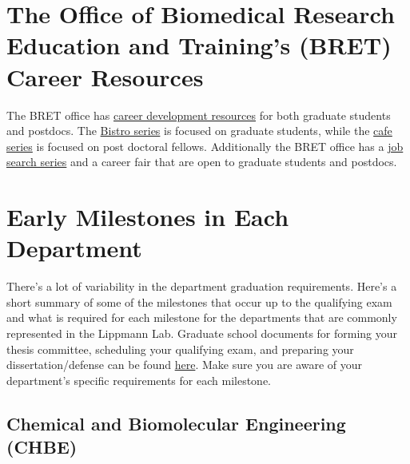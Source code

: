 \documentclass[
]{book}
\begin{document}
\hypertarget{the-office-of-biomedical-research-education-and-trainings-bret-career-resources}{%
\section{The Office of Biomedical Research Education and Training's (BRET) Career Resources}\label{the-office-of-biomedical-research-education-and-trainings-bret-career-resources}}

The BRET office has \href{https://medschool.vanderbilt.edu/career-development/}{career development resources} for both graduate students and postdocs. The \href{https://medschool.vanderbilt.edu/career-development/aspire-bistro-for-phd-students/}{Bistro series} is focused on graduate students, while the \href{https://medschool.vanderbilt.edu/career-development/aspire-cafe-for-postdoctoral-fellows/}{cafe series} is focused on post doctoral fellows. Additionally the BRET office has a \href{https://medschool.vanderbilt.edu/career-development/aspire-job-search-series-for-phd-students-and-postdocs/}{job search series} and a career fair that are open to graduate students and postdocs.

\hypertarget{early-milestones-in-each-department}{%
\section{Early Milestones in Each Department}\label{early-milestones-in-each-department}}

There's a lot of variability in the department graduation requirements. Here's a short summary of some of the milestones that occur up to the qualifying exam and what is required for each milestone for the departments that are commonly represented in the Lippmann Lab. Graduate school documents for forming your thesis committee, scheduling your qualifying exam, and preparing your dissertation/defense can be found \href{https://gradschool.vanderbilt.edu/academics/forms_timeline.php}{here}. Make sure you are aware of your department's specific requirements for each milestone.

\hypertarget{chbe}{%
\subsection{Chemical and Biomolecular Engineering (CHBE)}\label{chbe}}
\end{document}
